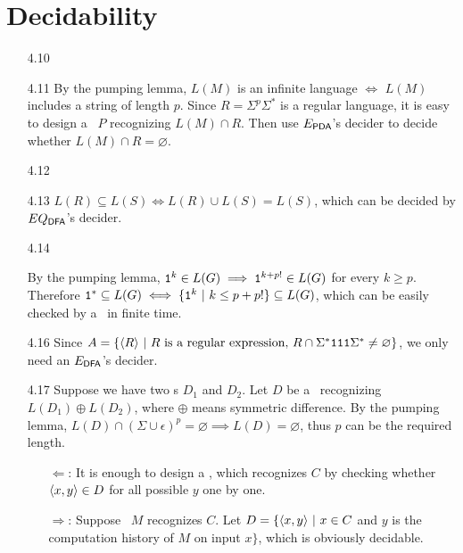 \section{Decidability}

\begin{itemize}
	
	\item[4.10]
	\Omit
	
	\item[4.11]
	By the pumping lemma, $L(M)$ is an infinite language $\iff$ $L(M)$ includes a string of length $p$. Since $R = \Sigma^p \Sigma^*$ is a regular language, it is easy to design a \PDA \ $P$ recognizing $L(M) \cap R$. Then use $E_{\PDA}$'s decider to decide whether $L(M) \cap R = \varnothing$.
	
	\item[4.12]
	\Omit
	
	\item[4.13]
	$L(R) \subseteq L(S) \iff L(R) \cup L(S) = L(S)$, which can be decided by $EQ_{\DFA}$'s decider.
	
	\item[4.14]
	\Omit
	
	\item[\Star 4.15]
	By the pumping lemma, $\TT{1}^k \in L(G) \implies \TT{1}^{k+p!} \in L(G)$ for every $k \geq p$. Therefore $\TT{1}^* \subseteq L(G) \iff \{ \TT{1}^k \ | \ k \leq p+p! \} \subseteq L(G)$, which can be easily checked by a \TM \ in finite time.
	
	\item[4.16]
	Since $A = \{ \Bra{R} \ | \ \text{$R$ is a regular expression, } R \cap \Sigma^* \TT{111} \Sigma^* \neq \varnothing \}$, we only need an $E_{\DFA}$'s decider.
	
	\item[4.17]
	Suppose we have two \DFA s $D_1$ and $D_2$. Let $D$ be a \DFA \ recognizing $L(D_1) \oplus L(D_2)$, where $\oplus$ means symmetric difference. By the pumping lemma, $L(D) \cap (\Sigma \cup \epsilon)^p = \varnothing \implies L(D) = \varnothing$, thus $p$ can be the required length.
	
	\item[\Star 4.18] 
	\begin{itemize}
		\item[$\Leftarrow$:] It is enough to design a \TM , which recognizes $C$ by checking whether $\Bra{x,y} \in D$ for all possible $y$ one by one.
		\item[$\Rightarrow$:] Suppose \TM \ $M$ recognizes $C$. Let $D = \{ \Bra{x,y} \ | \ x \in C$  and $y$ is the computation history of $M$ on input $x \}$, which is obviously decidable.
	\end{itemize}


\end{itemize}
